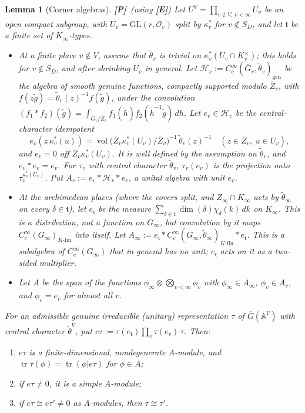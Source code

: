 \documentclass[12pt]{article}
\newcommand{\ov}[1]{\overline{#1}}
\newcommand{\A}{\mathbb{A}}
\newcommand{\cO}{\mathcal{O}}
\newcommand{\gen}{\mathrm{gen}}
\newcommand{\tr}{\operatorname{tr}}
\newcommand{\vol}{\operatorname{vol}}
\newcommand{\GL}{\mathrm{GL}}
\newcommand{\Gb}{\ov{G}}
\newcommand{\Zb}{\ov{Z}}
\newcommand{\ks}{\kappa^{*}}
\newcommand{\Pv}{\textbf{[P]}}
\newcommand{\Ev}{\textbf{[E]}}
\theoremstyle{plain}
\newtheorem{lemma}[theorem]{Lemma}
\theoremstyle{definition}
\begin{document}
\begin{lemma}[Corner algebras]\label{lem:corner}\Pv\ (using \Ev)
Let $U^V=\prod_{v\notin V,\,v<\infty}U_v$ be an open compact subgroup, with $U_v=\GL(r,\cO_v)$ split by $\ks_v$ for $v\notin S_D$, and let $\mathfrak t$ be a finite set of $K_\infty$-types.
\begin{itemize}
\item At a finite place $v\notin V$, assume that $\tilde\theta_v$ is trivial on $\ks_v(U_v\cap K_v^\times)$; this holds for $v\notin S_D$, and after shrinking $U_v$ in general. Let $\mathcal H_v:=C_c^\infty(\Gb_v,\tilde\theta_v)_\gen$ be the algebra of smooth genuine functions, compactly supported modulo $\Zb_v$, with $f(z\tilde g)=\tilde\theta_v(z)^{-1}f(\tilde g)$, under the convolution $(f_1*f_2)(\tilde g)=\int_{\Gb_v/\Zb_v}f_1(\tilde h)f_2(\tilde h^{-1}\tilde g)\,d\dot h$. Let $e_v\in\mathcal H_v$ be the central-character idempotent
\[ e_v(z\,\ks_v(u))=\vol\big(\Zb_v\ks_v(U_v)/\Zb_v\big)^{-1}\,\tilde\theta_v(z)^{-1}\quad(z\in\Zb_v,\ u\in U_v), \]
and $e_v=0$ off $\Zb_v\ks_v(U_v)$.
It is well defined by the assumption on $\tilde\theta_v$, and $e_v*e_v=e_v$. For $\tau_v$ with central character $\tilde\theta_v$, $\tau_v(e_v)$ is the projection onto $\tau_v^{\ks_v(U_v)}$. Put $A_v:=e_v*\mathcal H_v*e_v$, a unital algebra with unit $e_v$.
\item At the archimedean places (where the covers split, and $Z_\infty\cap K_\infty$ acts by $\tilde\theta_\infty$ on every $\delta\in\mathfrak t$), let $e_{\mathfrak t}$ be the measure $\sum_{\delta\in\mathfrak t}\dim(\delta)\ov{\chi_\delta(k)}\,dk$ on $K_\infty$. This is a distribution, not a function on $G_\infty$, but convolution by it maps $C_c^\infty(G_\infty)_{K\text{-fin}}$ into itself. Let $A_\infty:=e_{\mathfrak t}*C_c^\infty(G_\infty,\tilde\theta_\infty)_{K\text{-fin}}*e_{\mathfrak t}$. This is a subalgebra of $C_c^\infty(G_\infty)$ that in general has no unit; $e_{\mathfrak t}$ acts on it as a two-sided multiplier.
\item Let $A$ be the span of the functions $\phi_\infty\otimes\bigotimes_{v<\infty}\phi_v$ with $\phi_\infty\in A_\infty$, $\phi_v\in A_v$, and $\phi_v=e_v$ for almost all $v$.
\end{itemize}
For an admissible genuine irreducible (unitary) representation $\tau$ of $\Gb(\A^V)$ with central character $\tilde\theta^V$, put $e\tau:=\tau(e_{\mathfrak t})\prod_v\tau(e_v)\,\tau$. Then:
\begin{enumerate}[label=(\alph*)]
\item $e\tau$ is a finite-dimensional, nondegenerate $A$-module, and $\tr\tau(\phi)=\tr(\phi|e\tau)$ for $\phi\in A$;
\item if $e\tau\ne0$, it is a simple $A$-module;
\item if $e\tau\cong e\tau'\ne0$ as $A$-modules, then $\tau\cong\tau'$.
\end{enumerate}
\end{lemma}
\end{document}
